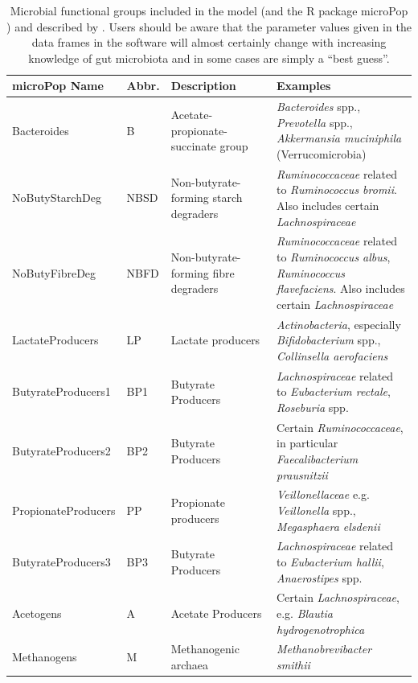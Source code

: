 \documentclass[a4paper]{article}
\begin{document}
\begin{table}[ht]
    \caption{Microbial functional groups included in the model (and the R package microPop \citep{Kettle2018}) and described by \cite{Kettle2015}. Users should be aware that the parameter values given in the data frames in the software will almost certainly change with increasing knowledge of gut microbiota and in some cases are simply a ``best guess''. }
    \small
    \centering

\begin{tabular}{|p{0.24\linewidth} | p{0.06\linewidth} | p{0.3\linewidth} | p{0.4\linewidth}|}
        \hline
microPop Name & Abbr. &	Description &	Examples\\
\hline
Bacteroides 	& B &Acetate-propionate-succinate group & 	\textit{Bacteroides} spp., \textit{Prevotella} spp.,  \textit{Akkermansia muciniphila} (Verrucomicrobia)\\
NoButyStarchDeg & NBSD &Non-butyrate-forming starch degraders & \textit{Ruminococcaceae} related to \textit{Ruminococcus bromii}. Also includes certain \textit{Lachnospiraceae}\\
NoButyFibreDeg & NBFD &	Non-butyrate-forming fibre degraders &	\textit{Ruminococcaceae} related to \textit{Ruminococcus albus}, \textit{Ruminococcus flavefaciens}. Also includes certain \textit{Lachnospiraceae}\\
LactateProducers & LP&	Lactate producers &	\textit{Actinobacteria}, especially \textit{Bifidobacterium} spp., \textit{Collinsella aerofaciens}\\
ButyrateProducers1  & BP1& 	Butyrate Producers &	\textit{Lachnospiraceae} related to \textit{Eubacterium rectale}, \textit{Roseburia} spp.\\
ButyrateProducers2 & BP2 &	Butyrate Producers &	Certain \textit{Ruminococcaceae}, in particular \textit{Faecalibacterium prausnitzii}\\
PropionateProducers & PP&	Propionate producers &	\textit{Veillonellaceae} e.g. \textit{Veillonella} spp., \textit{Megasphaera elsdenii}\\
ButyrateProducers3 & BP3&	Butyrate Producers & \textit{Lachnospiraceae} related to \textit{Eubacterium hallii}, \textit{Anaerostipes} spp.\\
Acetogens & A &	Acetate Producers &	Certain \textit{Lachnospiraceae}, e.g. \textit{Blautia hydrogenotrophica}\\
Methanogens & M&	Methanogenic archaea &	\textit{Methanobrevibacter smithii}\\
   \hline 
    \end{tabular}

    \label{table:groups}
\end{table}   
 
\end{document}
